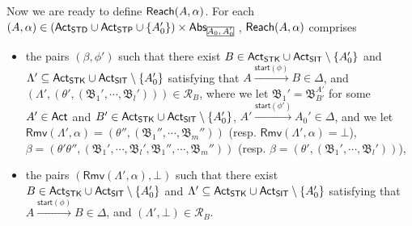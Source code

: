 \documentclass[preprint,12pt]{elsarticle}
\newcommand\rectangled[1]{\tikz[baseline=(torect.base)]{
    \node[shape = rectangle, draw, inner sep=0pt, outer sep = 0pt] (torect) {#1}
    }
}
\newcommand{\mrectangled}[1]{\text{\rectangled{\ensuremath{#1}}}}
\newcommand{\mhcancel}[1]{\mrectangled{#1}}
\newcommand\act{{\sf Act}}
\newcommand\aft{{\sf Aft}}
\newcommand\startactivity{{\mathsf{start} }}
\newcommand\abs{{\mathsf{Abs} }}
\newcommand\AutReach{\mathscr{R}}
\newcommand\reach{{\sf Reach}}
\newcommand{\STK}{\mathsf{STK}}
\newcommand{\SIT}{\mathsf{SIT}}
\newcommand{\STD}{\mathsf{STD}}
\newcommand{\STP}{\mathsf{STP}}
\newcommand\AutB{{\mathfrak{B} }}
\newcommand\rmv{\mathsf{Rmv}}
\begin{document}
{Now we are ready to define $\reach(A,\alpha)$. For each $(A,\alpha) \in (\act_{\STD}\cup\act_{\STP}\cup\{A_0'\})\times\abs_{\mhcancel{A_0,A_0'}}$, $\reach(A,\alpha)$ comprises
 \begin{itemize}
     \item the pairs $(\beta, \phi')$ such that there exist $B\in\act_{\STK}\cup\act_\SIT\setminus\{A_0'\}$ and $\Lambda'\subseteq\act_{\STK}\cup\act_\SIT\setminus\{A_0'\}$ satisfying that $A\xrightarrow{\startactivity(\phi)}B\in\Delta$, and $(\Lambda',(\theta',(\AutB_1',\cdots,\AutB_l')))\in\AutReach_{B}$, where
     we let $\AutB_1' = \AutB_{B'}^{A'}$ for some $A'\in\act$ and $B'\in\act_{\STK}\cup\act_\SIT\setminus\{A_0'\}$, $A'\xrightarrow{\startactivity(\phi')}A_0'\in\Delta$, and we let $\rmv(\Lambda',\alpha) = (\theta'',(\AutB_1'',\cdots,\AutB_m''))$ (resp. $\rmv(\Lambda',\alpha) = \bot$), $\beta = (\theta'\theta'',(\AutB_1',\cdots,\AutB_l',\AutB_1'',\cdots,\AutB_m''))$ (resp. $\beta = (\theta',(\AutB_1',\cdots,\AutB_l'))$),
%
    \item the pairs $(\rmv(\Lambda',\alpha), \bot)$ such that there exist $B\in\act_{\STK}\cup\act_\SIT\setminus\{A_0'\}$ and $\Lambda'\subseteq\act_{\STK}\cup\act_\SIT\setminus\{A_0'\}$ satisfying that $A\xrightarrow{\startactivity(\phi)}B\in\Delta$, and $(\Lambda',\bot)\in\AutReach_{B}$.
     
 \end{itemize}

}
\end{document}
